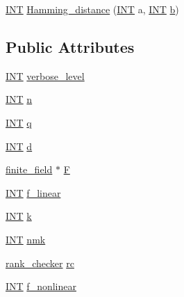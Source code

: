 \begin{DoxyCompactItemize}
\item 
\mbox{\hyperlink{galois_8h_a09fddde158a3a20bd2dcadb609de11dc}{I\+NT}} \mbox{\hyperlink{classcode__generator_a6ae1b16555e2126c58bba83c8fa3bb23}{Hamming\+\_\+distance}} (\mbox{\hyperlink{galois_8h_a09fddde158a3a20bd2dcadb609de11dc}{I\+NT}} a, \mbox{\hyperlink{galois_8h_a09fddde158a3a20bd2dcadb609de11dc}{I\+NT}} \mbox{\hyperlink{alphabet2_8_c_a148e3876077787926724625411d6e7a9}{b}})
\end{DoxyCompactItemize}
\subsection*{Public Attributes}
\begin{DoxyCompactItemize}
\item 
\mbox{\hyperlink{galois_8h_a09fddde158a3a20bd2dcadb609de11dc}{I\+NT}} \mbox{\hyperlink{classcode__generator_a603e29bac4d2fb4de7237ac66405c9c1}{verbose\+\_\+level}}
\item 
\mbox{\hyperlink{galois_8h_a09fddde158a3a20bd2dcadb609de11dc}{I\+NT}} \mbox{\hyperlink{classcode__generator_a44f140e4c8766ebe7674d1212fda7a08}{n}}
\item 
\mbox{\hyperlink{galois_8h_a09fddde158a3a20bd2dcadb609de11dc}{I\+NT}} \mbox{\hyperlink{classcode__generator_aa27272371ac2b116ff5f0af55f262add}{q}}
\item 
\mbox{\hyperlink{galois_8h_a09fddde158a3a20bd2dcadb609de11dc}{I\+NT}} \mbox{\hyperlink{classcode__generator_a475b828931568445df212e0e51959af3}{d}}
\item 
\mbox{\hyperlink{classfinite__field}{finite\+\_\+field}} $\ast$ \mbox{\hyperlink{classcode__generator_a020022010df94041606f618558c59040}{F}}
\item 
\mbox{\hyperlink{galois_8h_a09fddde158a3a20bd2dcadb609de11dc}{I\+NT}} \mbox{\hyperlink{classcode__generator_af8ff2a574f705b228651e55bc533d60f}{f\+\_\+linear}}
\item 
\mbox{\hyperlink{galois_8h_a09fddde158a3a20bd2dcadb609de11dc}{I\+NT}} \mbox{\hyperlink{classcode__generator_a772442f5caf923a84a8dfe4eb41440e0}{k}}
\item 
\mbox{\hyperlink{galois_8h_a09fddde158a3a20bd2dcadb609de11dc}{I\+NT}} \mbox{\hyperlink{classcode__generator_a2f4a39d9d93aa31053cd6fc140382685}{nmk}}
\item 
\mbox{\hyperlink{classrank__checker}{rank\+\_\+checker}} \mbox{\hyperlink{classcode__generator_aeab1f27ff918ab5ca322d46cfa70fd3b}{rc}}
\item 
\mbox{\hyperlink{galois_8h_a09fddde158a3a20bd2dcadb609de11dc}{I\+NT}} \mbox{\hyperlink{classcode__generator_a8b6eda2650a43b8be453498e23cbb7a0}{f\+\_\+nonlinear}}

\end{DoxyCompactItemize}
